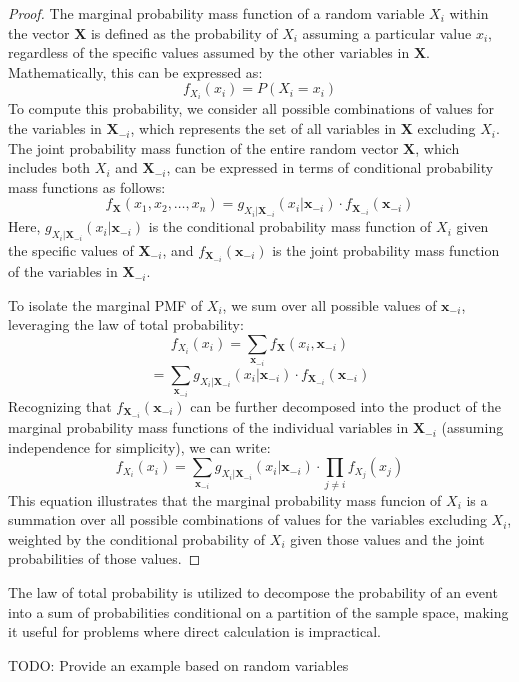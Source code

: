 \begin{proof}
The marginal probability mass function of a random variable $X_i$ within the vector $\mathbf{X}$ is defined as the probability of $X_i$ assuming a particular value $x_i$, regardless of the specific values assumed by the other variables in $\mathbf{X}$. Mathematically, this can be expressed as:
\[
f_{X_i}(x_i) = P(X_i = x_i)
\]
To compute this probability, we consider all possible combinations of values for the variables in $\mathbf{X}_{-i}$, which represents the set of all variables in $\mathbf{X}$ excluding $X_i$. The joint probability mass function of the entire random vector $\mathbf{X}$, which includes both $X_i$ and $\mathbf{X}_{-i}$, can be expressed in terms of conditional probability mass functions as follows:
\[
f_{\mathbf{X}}(x_1, x_2, \ldots, x_n) = g_{X_i|\mathbf{X}_{-i}}(x_i|\mathbf{x}_{-i}) \cdot f_{\mathbf{X}_{-i}}(\mathbf{x}_{-i})
\]
Here, $g_{X_i|\mathbf{X}_{-i}}(x_i|\mathbf{x}_{-i})$ is the conditional probability mass function of $X_i$ given the specific values of $\mathbf{X}_{-i}$, and $f_{\mathbf{X}_{-i}}(\mathbf{x}_{-i})$ is the joint probability mass function of the variables in $\mathbf{X}_{-i}$.

To isolate the marginal PMF of $X_i$, we sum over all possible values of $\mathbf{x}_{-i}$, leveraging the law of total probability:
\[
f_{X_i}(x_i) = \sum_{\mathbf{x}_{-i}} f_{\mathbf{X}}(x_i, \mathbf{x}_{-i}) 
\]
\[
= \sum_{\mathbf{x}_{-i}} g_{X_i|\mathbf{X}_{-i}}(x_i|\mathbf{x}_{-i}) \cdot f_{\mathbf{X}_{-i}}(\mathbf{x}_{-i}) 
\]
Recognizing that $f_{\mathbf{X}_{-i}}(\mathbf{x}_{-i})$ can be further decomposed into the product of the marginal probability mass functions of the individual variables in $\mathbf{X}_{-i}$ (assuming independence for simplicity), we can write:
\[
f_{X_i}(x_i) = \sum_{\mathbf{x}_{-i}} g_{X_i|\mathbf{X}_{-i}}(x_i|\mathbf{x}_{-i}) \cdot \prod_{j \neq i} f_{X_j}(x_j)
\]
This equation illustrates that the marginal probability mass funcion of $X_i$ is a summation over all possible combinations of values for the variables excluding $X_i$, weighted by the conditional probability of $X_i$ given those values and the joint probabilities of those values.
\end{proof}

The law of total probability is utilized to decompose the probability of an event into a sum of probabilities conditional on a partition of the sample space, making it useful for problems where direct calculation is impractical.

\begin{example}
{\color{red} TODO: Provide an example based on random variables}
\end{example}

